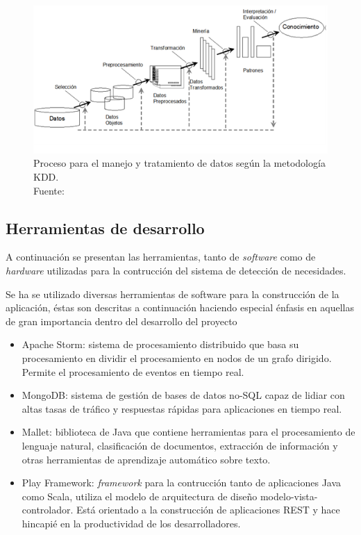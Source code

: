 \begin{figure}[H]
	\centering
	\captionsetup{justification=centering}
	\includegraphics[scale=1]{images/kdd.png}
	\caption[Proceso para el manejo y tratamiento de datos según la metodología KDD.]{Proceso para el manejo y tratamiento de datos según la metodología KDD.\\Fuente: \cite{KDDFigure}}
	\label{fig:procesoKDD}
\end{figure}

\subsection{Herramientas de desarrollo}
\label{subsec:HerrDesarrollo}

A continuación se presentan las herramientas, tanto de \textit{software} como de \textit{hardware} utilizadas para la contrucción del sistema de detección de necesidades.

Se ha se utilizado diversas herramientas de software para la construcción de la aplicación, éstas son descritas a continuación haciendo especial énfasis en aquellas de gran importancia dentro del desarrollo del proyecto

\begin{itemize}
\item Apache Storm: sistema de procesamiento distribuido que basa su procesamiento en dividir el procesamiento en nodos de un grafo dirigido. Permite el procesamiento de eventos en tiempo real.
\item MongoDB: sistema de gestión de bases de datos no-SQL capaz de lidiar con altas tasas de tráfico y respuestas rápidas para aplicaciones en tiempo real.
\item Mallet: biblioteca de Java que contiene herramientas para el procesamiento de lenguaje natural, clasificación de documentos, extracción de información y otras herramientas de aprendizaje automático sobre texto. 
\item Play Framework: \textit{framework} para la contrucción tanto de aplicaciones Java como Scala, utiliza el modelo de arquitectura de diseño modelo-vista-controlador. Está orientado a la construcción de aplicaciones REST y hace hincapié en la productividad de los desarrolladores.
\end{itemize}

